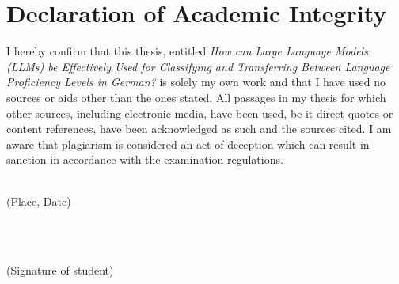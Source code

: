 \chapter*{Declaration of Academic Integrity}



I hereby confirm that this thesis, entitled \textit{How can Large Language Models (LLMs) be Effectively Used for Classifying and Transferring Between Language Proficiency Levels in German?} is solely my own work and that I have used no sources or aids other than the ones stated. All passages in my thesis for which other sources, including electronic media, have been used, be it direct quotes or content references, have been acknowledged as such and the sources cited. I am aware that plagiarism is considered an act of deception which can result in sanction in accordance with the examination regulations.

\vspace*{2cm}

\begin{minipage}{0.5\textwidth}
  \begin{flushleft} \large
    \underline{\hspace{6cm}} \\
    {\footnotesize (Place, Date)}
  \end{flushleft}
\end{minipage}
~
\begin{minipage}{0.5\textwidth}
  \begin{flushright} \large
    \underline{\hspace{6cm}} \\
    {\footnotesize (Signature of student)}
  \end{flushright}
\end{minipage}\\[0.5cm]

